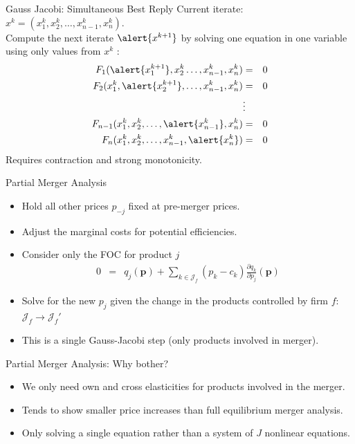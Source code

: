 \documentclass[xcolor=pdftex,dvipsnames,table,mathserif,aspectratio=169]{beamer}
\begin{document}
\begin{frame}{Gauss Jacobi: Simultaneous Best Reply}
Current iterate: $x^k = (x_1^k,x_2^k,\ldots,x_{n-1}^k,x_n^k)$.\\
\vspace{0.5cm}
Compute the next iterate $\alert{x^{k+1}}$ by solving one equation in one variable using only values from $x^k$ : 
\begin{eqnarray*}
F_1 (\alert{x_1^{k+1}},x_2^k \ldots, x_{n-1}^k, x_n^k)  &=& 0 \\
F_2  (x_1^k,\alert{x_2^{k+1}},\ldots,x_{n-1}^k,x_n^k)  &=& 0\\
&\vdots&\\ 
F_{n-1}  (x_1^k,x_2^k,\ldots,\alert{x_{n-1}^k},x_n^k)  &=& 0\\
F_n  (x_1^k,x_2^k,\ldots,x_{n-1}^k, \alert{x_n^k})  &=& 0\\
\end{eqnarray*}
Requires contraction and strong monotonicity.
\end{frame} 

\begin{frame}{Partial Merger Analysis}
\begin{itemize}
\item Hold all other prices $p_{-j}$ fixed at \alert{pre-merger} prices.
\item Adjust the marginal costs for potential efficiencies.
\item Consider only the FOC for product $j$
\begin{eqnarray*}
0&=& q_j(\mathbf{p}) + \sum_{k \in \mathcal{J}_f} (p_k - c_k) \frac{\partial q_{k}}{\partial p_j}(\mathbf{p})
\end{eqnarray*}
\item Solve for the new $p_j$ given the change in the products controlled by firm $f$: $\mathcal{J}_f \rightarrow \mathcal{J}_f'$
\item This is a single Gauss-Jacobi step (only products involved in merger).
\end{itemize}
\end{frame} 

\begin{frame}{Partial Merger Analysis: Why bother?}
\begin{itemize}
\item We only need own and cross elasticities for products involved in the merger.
\item Tends to show smaller price increases than full equilibrium merger analysis.
\item Only solving a single equation rather than a system of $J$ nonlinear equations.
\end{itemize}
\end{frame} 
\end{document}
